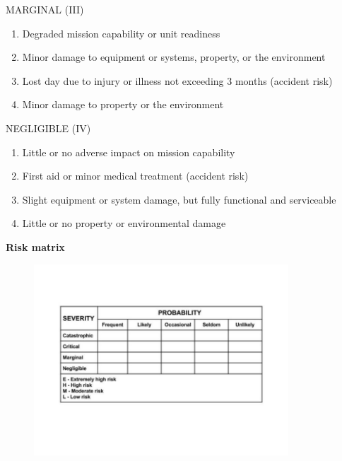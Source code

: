 \documentclass[aspectratio=1610,pdftex,dvipsnames,compress,xcolor={dvipsnames}]{beamer}
\begin{document}
\begin{frame}{MARGINAL (III)}
    \begin{enumerate}[series=outerlist,topsep=0pt,itemsep=21pt,leftmargin=*,label=(\arabic*)]
        \item[]Degraded mission capability or unit readiness
        \item[]Minor damage to equipment or systems, property, or the environment
        \item[]Lost day due to injury or illness not exceeding 3 months (accident risk)
        \item[]Minor damage to property or the environment
    \end{enumerate}
\end{frame}


\begin{frame}{NEGLIGIBLE (IV)}
    \begin{enumerate}[series=outerlist,topsep=0pt,itemsep=21pt,leftmargin=*,label=(\arabic*)]
        \item[]Little or no adverse impact on mission capability
        \item[]First aid or minor medical treatment (accident risk)
        \item[]Slight equipment or system damage, but fully functional and serviceable
        \item[]Little or no property or environmental damage
    \end{enumerate}
\end{frame}


\begin{frame}[plain]{}
    \centering\LARGE\textbf{Risk matrix}
\end{frame}


\addtocounter{framenumber}{-1}
\begin{frame}{}
    \begin{figure}
        \centering
        \includegraphics[width=0.85\textwidth]{risk.assessment.matrix.jpg}
    \end{figure}
\end{frame}
\end{document}
